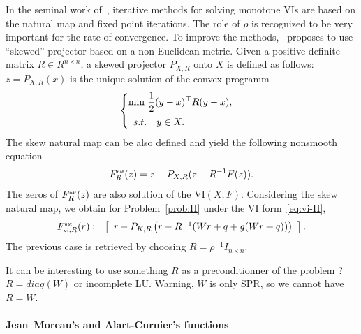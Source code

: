 {In the seminal work of~\cite{Sibony1970}, iterative methods for solving monotone VIs are based on the natural map and fixed point iterations. The role of $\rho$ is recognized to be very important for the rate of convergence. To improve the methods,~\citet{Sibony1970} proposes to use ``skewed'' projector based on a non-Euclidean metric. Given a positive definite matrix $R\in R^{n\times n}$, a skewed projector $P_{X,R}$ onto $X$ is defined as follows: $z  = P_{X,R}(x)$ is the unique solution of the convex programm
\begin{equation}
  \label{eq:opt-proj-skew}
  \begin{cases}
    \min\, \Frac 1 2 (y-x)^\top R (y-x), \\[2mm]
    \begin{array}{ll}
    s.t. & y \in X .
  \end{array}
  \end{cases}
\end{equation} 
The skew natural map can be also defined and yield the following nonsmooth equation
\begin{equation}
  \label{eq:skew-natural-NE}
   F_R^\nat(z) = z - P_{X,R}(z-R^{-1} F(z)).
\end{equation}
The zeros of $F_R^{\hbox{\sf \tiny{nat}}}(z)$ are also solution of the $\mathrm{VI}(X,F)$.
Considering the skew natural map, we obtain for Problem~\ref{prob:II} under the VI form~\eqref{eq:vi-II},
\begin{equation}
  \label{eq:natural-typeII}
  F_{\vitwo,R}^\nat(r) \coloneqq \left[
  \begin{array}{l} 
    r - P_{K,R}\left(r  - R^{-1} ( W r +q   + g(Wr+q))\right)  \end{array}\right].
\end{equation}
The previous case is retrieved by choosing $R = \rho^{-1} I_{n\times n}$.

\begin{ndrva}
  It can be interesting to use something $R$ as a preconditionner of the problem ? $R=diag(W)$ or incomplete LU. Warning, $W$ is only SPR, so we cannot have $R =W$.
\end{ndrva}

\paragraph{Jean--Moreau's and Alart-Curnier's functions}

}
